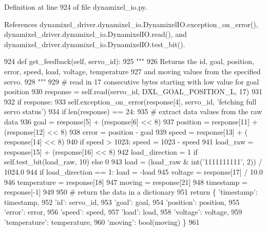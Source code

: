 Definition at line 924 of file dynamixel\+\_\+io.\+py.



References dynamixel\+\_\+driver.\+dynamixel\+\_\+io.\+Dynamixel\+I\+O.\+exception\+\_\+on\+\_\+error(), dynamixel\+\_\+driver.\+dynamixel\+\_\+io.\+Dynamixel\+I\+O.\+read(), and dynamixel\+\_\+driver.\+dynamixel\+\_\+io.\+Dynamixel\+I\+O.\+test\+\_\+bit().


\begin{DoxyCode}
924     \textcolor{keyword}{def }get\_feedback(self, servo\_id):
925         \textcolor{stringliteral}{"""}
926 \textcolor{stringliteral}{        Returns the id, goal, position, error, speed, load, voltage, temperature}
927 \textcolor{stringliteral}{        and moving values from the specified servo.}
928 \textcolor{stringliteral}{        """}
929         \textcolor{comment}{# read in 17 consecutive bytes starting with low value for goal position}
930         response = self.read(servo\_id, DXL\_GOAL\_POSITION\_L, 17)
931 
932         \textcolor{keywordflow}{if} response:
933             self.exception\_on\_error(response[4], servo\_id, \textcolor{stringliteral}{'fetching full servo status'})
934         \textcolor{keywordflow}{if} len(response) == 24:
935             \textcolor{comment}{# extract data values from the raw data}
936             goal = response[5] + (response[6] << 8)
937             position = response[11] + (response[12] << 8)
938             error = position - goal
939             speed = response[13] + ( response[14] << 8)
940             \textcolor{keywordflow}{if} speed > 1023: speed = 1023 - speed
941             load\_raw = response[15] + (response[16] << 8)
942             load\_direction = 1 \textcolor{keywordflow}{if} self.test\_bit(load\_raw, 10) \textcolor{keywordflow}{else} 0
943             load = (load\_raw & int(\textcolor{stringliteral}{'1111111111'}, 2)) / 1024.0
944             \textcolor{keywordflow}{if} load\_direction == 1: load = -load
945             voltage = response[17] / 10.0
946             temperature = response[18]
947             moving = response[21]
948             timestamp = response[-1]
949 
950             \textcolor{comment}{# return the data in a dictionary}
951             \textcolor{keywordflow}{return} \{ \textcolor{stringliteral}{'timestamp'}: timestamp,
952                      \textcolor{stringliteral}{'id'}: servo\_id,
953                      \textcolor{stringliteral}{'goal'}: goal,
954                      \textcolor{stringliteral}{'position'}: position,
955                      \textcolor{stringliteral}{'error'}: error,
956                      \textcolor{stringliteral}{'speed'}: speed,
957                      \textcolor{stringliteral}{'load'}: load,
958                      \textcolor{stringliteral}{'voltage'}: voltage,
959                      \textcolor{stringliteral}{'temperature'}: temperature,
960                      \textcolor{stringliteral}{'moving'}: bool(moving) \}
961 
\end{DoxyCode}
